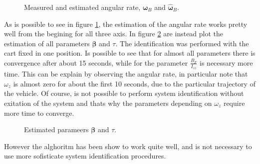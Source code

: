 \begin{figure}[h]
	\centering
 	
 	\caption{Measured and estimated angular rate, $\boldsymbol{\omega}_B$ and $\hat{\boldsymbol{\omega}}_B$.}
 	\label{fig:omegaKalman}		
\end{figure}

\noindent As is possible to see in figure \ref{fig:omegaKalman}, the estimation of the angular rate works pretty well from the begining for all three axis. In figure \ref{fig:betaTauKalman} are instead plot the estimation of all parameters $\boldsymbol{\beta}$ and $\tau$. The identification was performed with the cart fixed in one position. Is possible to see that for almost all parameters there is convergence after about 15 seconds, while for the parameter $\frac{B_F}{I_{zz}}$ is necessary more time. This can be explain by observing the angular rate, in particular note that $\omega_z$ is almost zero for about the first 10 seconds, due to the particular trajectory of the vehicle. Of course, is not possible to perform system identification without exitation of the system and thats why the parameters depending on $\omega_z$ require more time to converge.

\begin{figure}[h]
	\centering
	
	
	\caption{Estimated parameers $\boldsymbol{\beta}$ and $\tau$.}
	\label{fig:betaTauKalman}
\end{figure}

\noindent However the alghoritm has been show to work quite well, and is not necessary to use more sofisticate system identification procedures.

